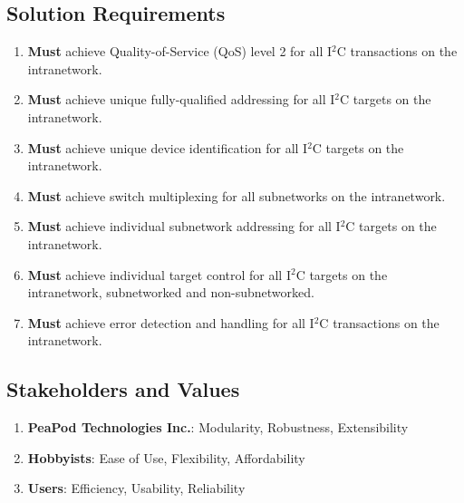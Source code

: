\documentclass{../tex/report}
\begin{document}
\subsection{Solution Requirements}\label{sec:requirements}

\begin{enumerate}[label=R\arabic*., ref=R\arabic*]
    \item\label{r:1} \textbf{Must} achieve Quality-of-Service (QoS) level 2 for all I$^2$C transactions on the intranetwork.
    \item\label{r:2} \textbf{Must} achieve unique fully-qualified addressing for all I$^2$C targets on the intranetwork.
    \item\label{r:3} \textbf{Must} achieve unique device identification for all I$^2$C targets on the intranetwork.
    \item\label{r:4} \textbf{Must} achieve switch multiplexing for all subnetworks on the intranetwork.
    \item\label{r:5} \textbf{Must} achieve individual subnetwork addressing for all I$^2$C targets on the intranetwork.
    \item\label{r:6} \textbf{Must} achieve individual target control for all I$^2$C targets on the intranetwork, subnetworked and non-subnetworked.
    \item\label{r:7} \textbf{Must} achieve error detection and handling for all I$^2$C transactions on the intranetwork.
\end{enumerate}

\subsection{Stakeholders and Values}\label{sec:stakeholders}

\begin{enumerate}[label=S\arabic*., ref=S\arabic*]
    \item\label{s:1} \textbf{PeaPod Technologies Inc.}: Modularity, Robustness, Extensibility
    \item\label{s:2} \textbf{Hobbyists}: Ease of Use, Flexibility, Affordability
    \item\label{s:3} \textbf{Users}: Efficiency, Usability, Reliability
\end{enumerate}
\end{document}
